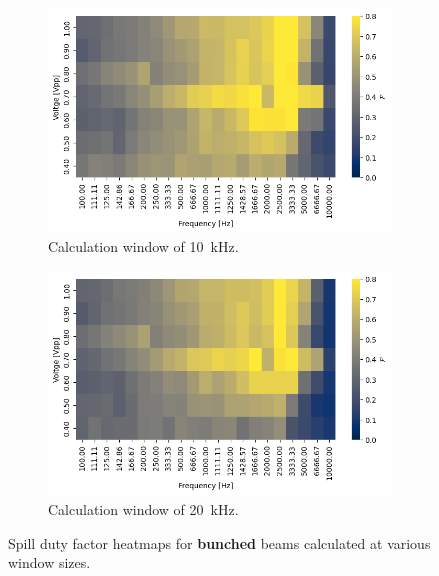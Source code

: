 \documentclass[a4paper,twoside,11pt]{report}
\begin{document}
\begin{appendices}
\begin{figure}[ht]
  \begin{subfigure}{.5\textwidth}
    \centering
    \includegraphics[width=.9\linewidth]{sdfs/on_10.png}
    \caption{Calculation window of \qty{10}{\kilo\hertz}.}
    \label{fig:sdf_on_10}
  \end{subfigure}%
  \begin{subfigure}{.5\textwidth}
    \centering
    \includegraphics[width=.9\linewidth]{sdfs/on_20.png}
    \caption{Calculation window of \qty{20}{\kilo\hertz}.}
    \label{fig:sdf_on_20}
  \end{subfigure}
  
  \caption{Spill duty factor heatmaps for \textbf{bunched} beams calculated at various window sizes.}
  \label{fig:sdf_on_grid}
  \end{figure}


\end{appendices}
\end{document}
